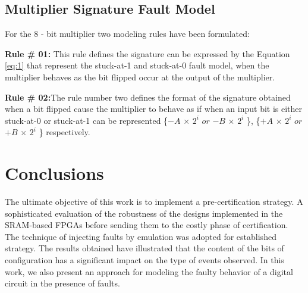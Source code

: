 \subsection{Multiplier Signature Fault Model}

For the 8 - bit multiplier two modeling rules have been formulated:

\textbf{Rule \# 01:} This rule defines the signature can be expressed by the Equation \ref{eq:1} that represent the stuck-at-1 and stuck-at-0 fault model, when the multiplier behaves as the bit flipped occur at the output of the multiplier. 

\textbf{Rule \# 02:}The rule number two defines the format of the signature obtained when a bit flipped cause the multiplier to behave as if when an input bit is either stuck-at-0 or stuck-at-1 can be represented \{$-$$A$ $\times$ $2^{i}$ $or$  $-$$B$ $\times$ $2^{i}$ \}, \{$+$$A$ $\times$ $2^{i}$ $or$  $+$$B$ $\times$ $2^{i}$ \} respectively.
\section{Conclusions}


The ultimate objective of this work is to implement a pre-certification strategy.
A sophisticated evaluation of the robustness of the designs implemented in the
SRAM-based FPGAs before sending them to the costly phase of
certification. The technique of injecting faults by emulation was adopted for
established strategy.  The results obtained have illustrated that the content of the bits of
configuration has a significant impact on the type of events observed. In this work, we also present an approach for modeling the faulty behavior of a
digital circuit in the presence of faults.
